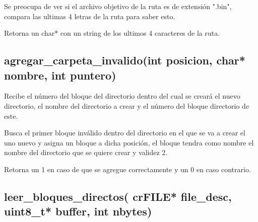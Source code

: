 \documentclass[12pt]{article}
\begin{document}
Se preocupa de ver si el archivo objetivo de la ruta es de extensión ".bin", compara las ultimas 4 letras de la ruta para saber esto.

Retorna un char* con un string de los ultimos 4 caracteres de la ruta.


\subsection{agregar\_carpeta\_invalido(int posicion, char* nombre, int puntero)}
Recibe el número del bloque del directorio dentro del cual se creará el nuevo directorio, el nombre del directorio a crear y el número del bloque directorio de este.

Busca el primer bloque inválido dentro del directorio en el que se va a crear el uno nuevo y asigna un bloque a dicha posición, el bloque tendra como nombre el nombre del directorio que se quiere crear y validez 2.

Retorna un 1 en caso de que se agregue correctamente y un 0 en caso contrario.

\subsection{leer\_bloques\_directos( crFILE* file\_desc, uint8\_t* buffer, int nbytes)}


\end{document}
